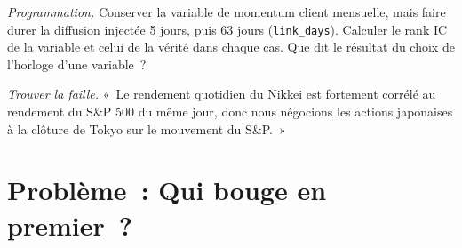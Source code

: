 \begin{exercise}[$\star\star\star$]\label{exo:rs:cross-sectional-and-cross-asset-features:7}
\emph{Programmation.} Conserver la variable de momentum client mensuelle, mais faire durer la diffusion injectée 5 jours, puis 63 jours
(\texttt{link\_days}). Calculer le rank IC de la variable et celui de la vérité dans chaque cas. Que dit le résultat du choix de l'horloge d'une
variable~?
\end{exercise}

\begin{exercise}[$\star\star\star$]\label{exo:rs:cross-sectional-and-cross-asset-features:8}
\emph{Trouver la faille.} «~Le rendement quotidien du Nikkei est fortement corrélé au rendement du S\&P 500 du même jour, donc nous négocions les actions japonaises
à la clôture de Tokyo sur le mouvement du S\&P.~»
\end{exercise}

\section{Problème~: Qui bouge en premier~?}

